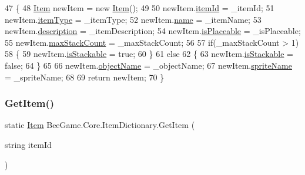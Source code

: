\begin{DoxyCode}
47         \{
48             \hyperlink{struct_bee_game_1_1_items_1_1_item}{Item} newItem = \textcolor{keyword}{new} \hyperlink{struct_bee_game_1_1_items_1_1_item}{Item}();
49 
50             newItem.\hyperlink{struct_bee_game_1_1_items_1_1_item_aa85bfeab893271c26f8ca41b638ada1c}{itemId} = \_itemId;
51             newItem.\hyperlink{struct_bee_game_1_1_items_1_1_item_a496672c00ab90403cbbbac6fab48f8ba}{itemType} = \_itemType;
52             newItem.\hyperlink{struct_bee_game_1_1_items_1_1_item_a0b0bd7eb510757f650f1be3d05b23fc8}{name} = \_itemName;
53             newItem.\hyperlink{struct_bee_game_1_1_items_1_1_item_a3173b5fb0a51e9063335e5cbf93c2e1b}{description} = \_itemDescription;
54             newItem.\hyperlink{struct_bee_game_1_1_items_1_1_item_ae95da57ec69cdb64b656caa5aa42b8c7}{isPlaceable} = \_isPlaceable;
55             newItem.\hyperlink{struct_bee_game_1_1_items_1_1_item_a045f162bbb378f44e8b89af901b29ff3}{maxStackCount} = \_maxStackCount;
56 
57             \textcolor{keywordflow}{if}(\_maxStackCount > 1)
58             \{
59                 newItem.\hyperlink{struct_bee_game_1_1_items_1_1_item_a2a58e4a805a560661ce6a4f1f21bfa1d}{isStackable} = \textcolor{keyword}{true};
60             \}
61             \textcolor{keywordflow}{else}
62             \{
63                 newItem.\hyperlink{struct_bee_game_1_1_items_1_1_item_a2a58e4a805a560661ce6a4f1f21bfa1d}{isStackable} = \textcolor{keyword}{false};
64             \}
65 
66             newItem.\hyperlink{struct_bee_game_1_1_items_1_1_item_ade55c08e49c1c4017c91978119876387}{objectName} = \_objectName;
67             newItem.\hyperlink{struct_bee_game_1_1_items_1_1_item_a268ba3cca2e9fa79fb5aff3c880f6505}{spriteName} = \_spriteName;
68 
69             \textcolor{keywordflow}{return} newItem;
70         \}
\end{DoxyCode}
\mbox{\label{class_bee_game_1_1_core_1_1_item_dictionary_a936e5313065bf33e4ed0cd766fa0fedb}} 
\subsubsection{\texorpdfstring{Get\+Item()}{GetItem()}}
{\footnotesize\ttfamily static \hyperlink{struct_bee_game_1_1_items_1_1_item}{Item} Bee\+Game.\+Core.\+Item\+Dictionary.\+Get\+Item (\begin{DoxyParamCaption}\item[{string}]{item\+Id }\end{DoxyParamCaption})\hspace{0.3cm}{\ttfamily [static]}}



